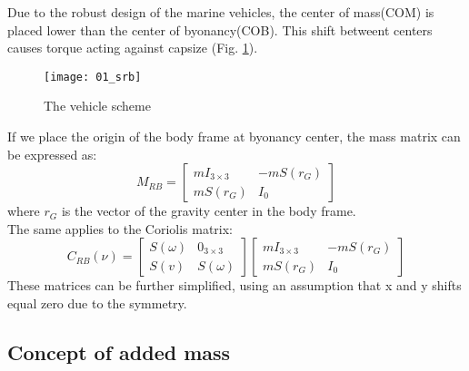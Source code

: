     Due to the robust design of the marine vehicles, the center of mass(COM) is placed lower than the center 
    of byonancy(COB).
    This shift betweent centers causes torque acting against capsize (Fig. \ref{image:scheme}).\\
    \begin{figure}[H]
        \centering\texttt{[image: 01\_srb]}
        \caption{The vehicle scheme}
        \label{image:scheme}
    \end{figure}
    If we place the origin of the body frame at byonancy center, the mass matrix can be expressed as:\\
    $$
    M_{R B}=\left[\begin{array}{cc}
        m I_{3 \times 3} & -m S\left(r_G\right) \\
        m S\left(r_G\right) & I_0
    \end{array}\right]
    $$
    where $r_G$ is the vector of the gravity center in the body frame.\\
    The same applies to the Coriolis matrix:
    $$
    C_{R B}(\nu) =\left[\begin{array}{cc}
        S(\omega) & 0_{3 \times 3} \\
        S(v) & S(\omega)
    \end{array}\right]\left[\begin{array}{cc}
        m I_{3 \times 3} & -m S\left(r_G\right) \\
        m S\left(r_G\right) & I_0
    \end{array}\right]
    $$
    These matrices can be further simplified, using an assumption that x and y shifts equal zero due to the symmetry. 
\subsection{Concept of added mass}

